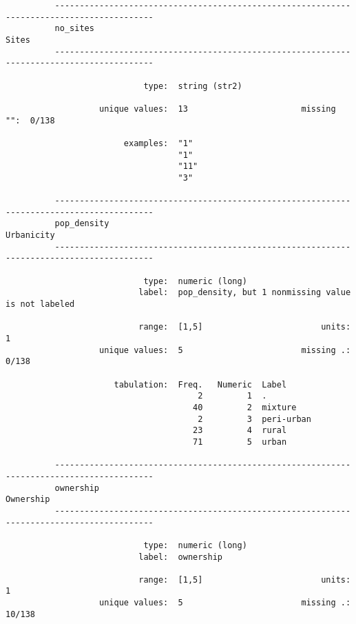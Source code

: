 \documentclass{article}
\begin{document}
\begin{verbatim}
          ------------------------------------------------------------------------------------------
          no_sites                                                                             Sites
          ------------------------------------------------------------------------------------------
          
                            type:  string (str2)
          
                   unique values:  13                       missing "":  0/138
          
                        examples:  "1"
                                   "1"
                                   "11"
                                   "3"
          
          ------------------------------------------------------------------------------------------
          pop_density                                                                     Urbanicity
          ------------------------------------------------------------------------------------------
          
                            type:  numeric (long)
                           label:  pop_density, but 1 nonmissing value is not labeled
          
                           range:  [1,5]                        units:  1
                   unique values:  5                        missing .:  0/138
          
                      tabulation:  Freq.   Numeric  Label
                                       2         1  .
                                      40         2  mixture
                                       2         3  peri-urban
                                      23         4  rural
                                      71         5  urban
          
          ------------------------------------------------------------------------------------------
          ownership                                                                        Ownership
          ------------------------------------------------------------------------------------------
          
                            type:  numeric (long)
                           label:  ownership
          
                           range:  [1,5]                        units:  1
                   unique values:  5                        missing .:  10/138
          

\end{verbatim}
\end{document}
